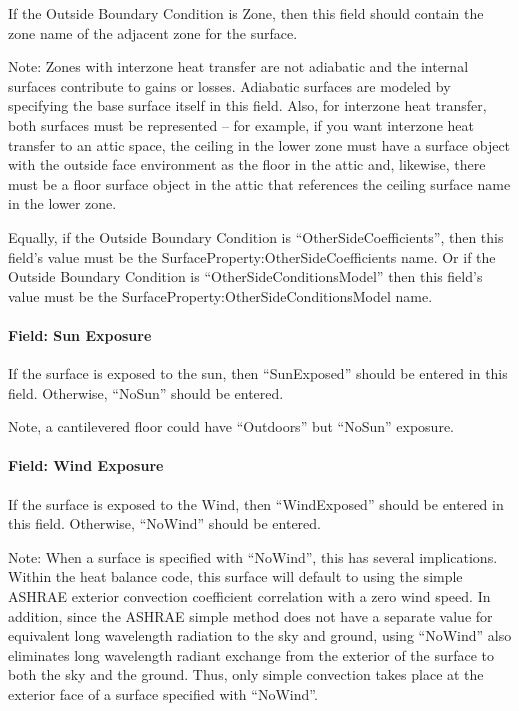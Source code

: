 If the Outside Boundary Condition is Zone, then this field should contain the zone name of the adjacent zone for the surface.

\begin{callout}
Note: Zones with interzone heat transfer are not adiabatic and the internal surfaces contribute to gains or losses. Adiabatic surfaces are modeled by specifying the base surface itself in this field. Also, for interzone heat transfer, both surfaces must be represented -- for example, if you want interzone heat transfer to an attic space, the ceiling in the lower zone must have a surface object with the outside face environment as the floor in the attic and, likewise, there must be a floor surface object in the attic that references the ceiling surface name in the lower zone.
\end{callout}

Equally, if the Outside Boundary Condition is ``OtherSideCoefficients'', then this field's value must be the SurfaceProperty:OtherSideCoefficients name. Or if the Outside Boundary Condition is ``OtherSideConditionsModel'' then this field's value must be the SurfaceProperty:OtherSideConditionsModel name.

\paragraph{Field: Sun Exposure}\label{field-sun-exposure-1}

If the surface is exposed to the sun, then ``SunExposed'' should be entered in this field. Otherwise, ``NoSun'' should be entered.

Note, a cantilevered floor could have ``Outdoors'' but ``NoSun'' exposure.

\paragraph{Field: Wind Exposure}\label{field-wind-exposure-1}

If the surface is exposed to the Wind, then ``WindExposed'' should be entered in this field. Otherwise, ``NoWind'' should be entered.

\begin{callout}
Note: When a surface is specified with ``NoWind'', this has several implications. Within the heat balance code, this surface will default to using the simple ASHRAE exterior convection coefficient correlation with a zero wind speed. In addition, since the ASHRAE simple method does not have a separate value for equivalent long wavelength radiation to the sky and ground, using ``NoWind'' also eliminates long wavelength radiant exchange from the exterior of the surface to both the sky and the ground. Thus, only simple convection takes place at the exterior face of a surface specified with ``NoWind''.
\end{callout}

